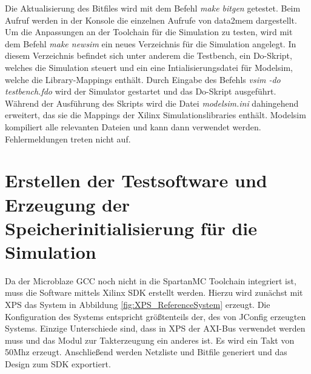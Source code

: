 Die Aktualisierung des Bitfiles wird mit dem Befehl \textit{make bitgen} getestet. Beim Aufruf werden in der Konsole die einzelnen Aufrufe von data2mem dargestellt.\\
Um die Anpassungen an der Toolchain für die Simulation zu testen, wird mit dem Befehl \textit{make newsim} ein neues Verzeichnis für die Simulation angelegt. In diesem Verzeichnis befindet sich unter anderem die Testbench, ein Do-Skript, welches die Simulation steuert und ein eine Intialisierungsdatei für Modelsim, welche die Library-Mappings enthält. Durch Eingabe des Befehls \textit{vsim -do testbench.fdo} wird der Simulator gestartet und das Do-Skript ausgeführt. Während der Ausführung des Skripts wird die Datei \textit{modelsim.ini} dahingehend erweitert, das sie die Mappings der Xilinx Simulationslibraries enthält. Modelsim kompiliert alle relevanten Dateien und kann dann verwendet werden. Fehlermeldungen treten nicht auf.
\section{Erstellen der Testsoftware und Erzeugung der Speicherinitialisierung für die Simulation}
Da der Microblaze GCC noch nicht in die SpartanMC Toolchain integriert ist, muss die Software mittels Xilinx SDK erstellt werden. Hierzu wird zunächst mit XPS das System in Abbildung \ref{fig:XPS_ReferenceSystem} erzeugt. Die Konfiguration des Systems entspricht größtenteils der, des von JConfig erzeugten Systems. Einzige Unterschiede sind, dass in XPS der AXI-Bus verwendet werden muss und das Modul zur Takterzeugung ein anderes ist. Es wird ein Takt von 50Mhz erzeugt. Anschließend werden Netzliste und Bitfile generiert und das Design zum SDK exportiert.

